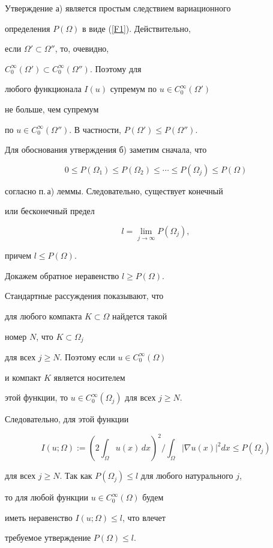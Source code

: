\begin{pf}


Утверждение а) является простым следствием вариационного


определения $P(\Omega)$ в виде (\ref{F1}). Действительно,


если $\Omega '\subset\Omega ''$, то, очевидно,


$C_0^\infty(\Omega ')\subset C_0^\infty(\Omega '')$. Поэтому для


любого функционала $I(u)$ супремум по $u\in C_0^\infty(\Omega ')$


не больше, чем супремум


по $u\in C_0^\infty(\Omega '')$. В частности, $P(\Omega ')\leq P(\Omega '')$.





Для обоснования утверждения б) заметим сначала, что


$$


0\leq P(\Omega_1)\leq P(\Omega_2)\leq \dotsb \leq P(\Omega_j)\leq P(\Omega)


$$


согласно п.\,а) леммы. Следовательно, существует конечный 


или бесконечный  предел


$$


l=\lim_{j\to\infty}P(\Omega_j),


$$


причем $l\leq P(\Omega)$.





Докажем обратное неравенство $l\geq P(\Omega)$. 


Стандартные рассуждения показывают, что


для любого компакта $K\subset\Omega$ найдется такой 


номер $N$, что $K\subset\Omega_j$


для всех $j\geq N$. Поэтому если $u\in C_0^\infty (\Omega)$ 


и компакт $K$ является носителем


этой функции, то $u\in C_0^\infty(\Omega_j)$ для всех $j\geq N$. 


Следовательно, для этой функции


$$


I(u;\Omega) :=\left( {2\int_\Omega u(x)\, dx} \right)^2 \Big/


\int_\Omega |\nabla u(x)|^2dx \leq P(\Omega_j)


$$


для всех $j\geq N$. Так как $P(\Omega_j)\leq l$ для любого натурального $j$,


то для любой функции $u\in C_0^\infty(\Omega)$ будем


иметь неравенство $I(u;\Omega)\leq l$, что влечет 


требуемое утверждение $P(\Omega)\leq l$.


\end{pf}








